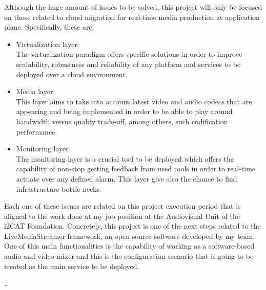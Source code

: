 Although the huge amount of issues to be solved, this project will only be focused on those related to cloud migration for real-time media production at application plane. Specifically, these are:

 \begin{itemize}
  \item Virtualization layer \hfill \\
  The virtualization paradigm offers specific solutions in order to improve scalability, robustness and reliability of any platform and services to be deployed over a cloud environment. 
  \item Media layer \hfill \\
  This layer aims to take into account latest video and audio codecs that are appearing and being implemented in order to be able to play around bandwidth versus quality trade-off, among others, such codification performance. 
  \item Monitoring layer \hfill \\
  The monitoring layer is a crucial tool to be deployed which offers the capability of non-stop getting feedback from used tools in order to real-time actuate over any defined alarm. This layer give also the chance to find infrastructure bottle-necks.
\end{itemize}

Each one of these issues are related on this project execution period that is aligned to the work done at my job position at the Audiovisual Unit of the i2CAT Foundation. Concretely, this project is one of the next steps related to the LiveMediaStreamer framework, an open-source software developed by my team. One of this main functionalities is the capability of working as a software-based audio and video mixer and this is the configuration scenario that is going to be treated as the main service to be deployed.

\ldots







